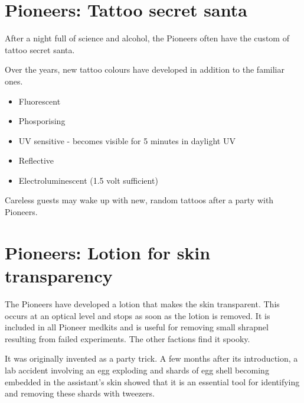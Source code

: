 \section{Pioneers: Tattoo secret santa}

After a night full of science and alcohol, the Pioneers often have the custom of tattoo secret santa.

Over the years, new tattoo colours have developed in addition to the familiar ones.

\begin{itemize}
    \item Fluorescent
    \item Phosporising
    \item UV sensitive - becomes visible for 5 minutes in daylight UV
    \item Reflective
    \item Electroluminescent (1.5 volt sufficient)
\end{itemize}

Careless guests may wake up with new, random tattoos after a party with Pioneers.

\section{Pioneers: Lotion for skin transparency}


The Pioneers have developed a lotion that makes the skin transparent. This occurs at an optical level and stops as soon as the lotion is removed. It is included in all Pioneer medkits and is useful for removing small shrapnel resulting from failed experiments. The other factions find it spooky.

It was originally invented as a party trick. A few months after its introduction, a lab accident involving an egg exploding and shards of egg shell becoming embedded in the assistant's skin showed that it is an essential tool for identifying and removing these shards with tweezers.





